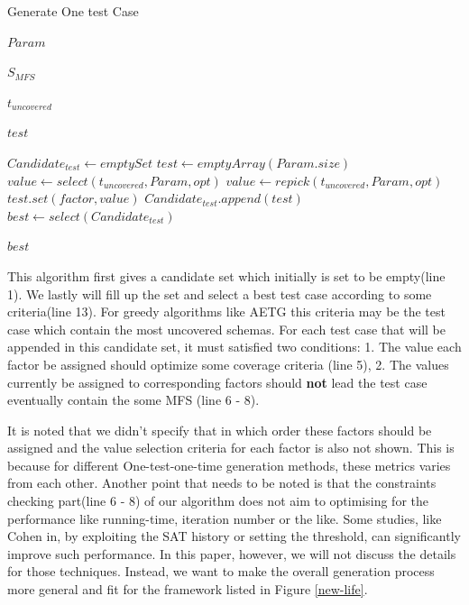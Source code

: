 \documentclass{sig-alternate}
\begin{document}
\begin{algorithm}
  \caption{Generate One test Case}
  \begin{algorithmic}[1]
     \Require
     $Param$ 

     $S_{MFS}$ 

     $t_{uncovered}$ 

     \Ensure  $test$ 

      \State $Candidate_{test} \leftarrow empty Set$
       \State $test \leftarrow emptyArray(Param.size)$
           \State   $value \leftarrow select(t_{uncovered},Param,opt)$
              \State $value \leftarrow repick(t_{uncovered},Param,opt) $
           \EndWhile
           \State $test.set(factor, value)$
       \EndFor
        \State $Candidate_{test}.append(test)$
       \EndWhile
       \State $best \leftarrow select(Candidate_{test})$

     \State \Return $best$
  \end{algorithmic}
\end{algorithm}

This algorithm first gives a candidate set which initially is set to be empty(line 1). We lastly will fill up the set and select a best test case according to some criteria(line 13). For greedy algorithms like AETG this criteria may be the test case which contain the most uncovered schemas. For each test case that will be appended in this candidate set, it must satisfied two conditions: 1. The value each factor be assigned should optimize some coverage criteria (line 5), 2. The values currently be assigned to corresponding factors should \textbf{not} lead the test case eventually contain the some MFS (line 6 - 8).

It is noted that we didn't specify that in which order these factors should be assigned and the value selection criteria for each factor is also not shown. This is because for different One-test-one-time generation methods, these metrics varies from each other. Another point that needs to be noted is that the constraints checking part(line 6 - 8) of our algorithm does not aim to optimising for the performance like running-time, iteration number or the like. Some studies, like Cohen in, by exploiting the SAT history or setting the threshold, can significantly improve such performance. In this paper, however, we will not discuss the details for those techniques. Instead, we want to make the overall generation process more general and fit for the framework listed in Figure \ref{new-life}.
\end{document}
